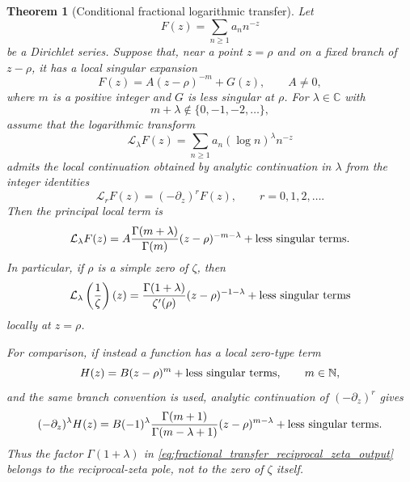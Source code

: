 \documentclass[11pt]{amsart}
\numberwithin{equation}{section}
\theoremstyle{plain}
\newtheorem{theorem}{Theorem}[section]
\theoremstyle{definition}
\theoremstyle{remark}
\begin{document}
\begin{theorem}[Conditional fractional logarithmic transfer]
\label{thm:fractional_log_transfer}
Let
\begin{equation}
F(z)=\sum_{n\ge1}a_n n^{-z}
\label{eq:fractional_transfer_F_definition}
\end{equation}
be a Dirichlet series.  Suppose that, near a point $z=\rho$ and on a
fixed branch of $z-\rho$, it has a local singular expansion
\begin{equation}
F(z)=A(z-\rho)^{-m}+G(z),
\qquad A\ne0,
\label{eq:fractional_transfer_pole_expansion}
\end{equation}
where $m$ is a positive integer and $G$ is less singular at $\rho$.
For $\lambda\in\mathbb C$ with
\begin{equation}
m+\lambda\notin\{0,-1,-2,\ldots\},
\label{eq:fractional_transfer_parameter_condition}
\end{equation}
assume that the logarithmic transform
\begin{equation}
\mathcal L_{\lambda}F(z)
=
\sum_{n\ge1}a_n(\log n)^\lambda n^{-z}
\label{eq:fractional_transfer_operator_definition}
\end{equation}
admits the local continuation obtained by analytic continuation in
$\lambda$ from the integer identities
\begin{equation}
\mathcal L_rF(z)=(-\partial_z)^rF(z),
\qquad r=0,1,2,\ldots .
\label{eq:fractional_transfer_integer_identity}
\end{equation}
Then the principal local term is
\begin{equation}
\mathcal L_{\lambda}F(z)
=
A\frac{\Gamma(m+\lambda)}{\Gamma(m)}(z-\rho)^{-m-\lambda}
+\textup{less singular terms}.
\label{eq:fractional_transfer_pole_output}
\end{equation}
In particular, if $\rho$ is a simple zero of $\zeta$, then
\begin{equation}
\mathcal L_{\lambda}\left(\frac1\zeta\right)(z)
=
\frac{\Gamma(1+\lambda)}{\zeta'(\rho)}(z-\rho)^{-1-\lambda}
+\textup{less singular terms}
\label{eq:fractional_transfer_reciprocal_zeta_output}
\end{equation}
locally at $z=\rho$.

For comparison, if instead a function has a local zero-type term
\begin{equation}
H(z)=B(z-\rho)^m+\textup{less singular terms},
\qquad m\in\mathbb N,
\label{eq:fractional_transfer_zero_type_input}
\end{equation}
and the same branch convention is used, analytic continuation of
$(-\partial_z)^r$ gives
\begin{equation}
(-\partial_z)^\lambda H(z)
=
B(-1)^\lambda\frac{\Gamma(m+1)}{\Gamma(m-\lambda+1)}(z-\rho)^{m-\lambda}
+\textup{less singular terms}.
\label{eq:fractional_transfer_zero_type_output}
\end{equation}
Thus the factor $\Gamma(1+\lambda)$ in
\eqref{eq:fractional_transfer_reciprocal_zeta_output} belongs to the
reciprocal-zeta pole, not to the zero of $\zeta$ itself.
\end{theorem}
\end{document}
